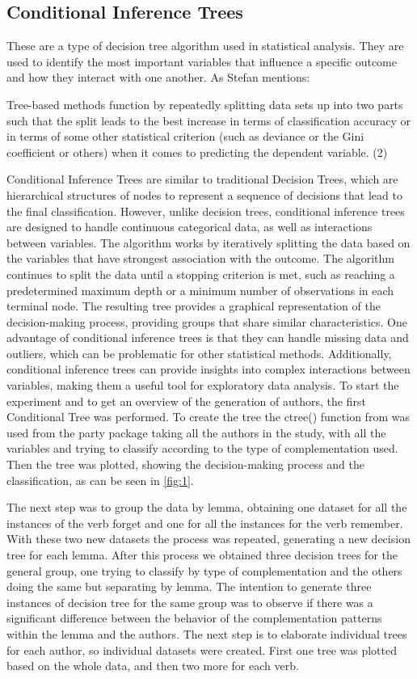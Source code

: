 \documentclass[final]{clv3} %
\begin{document}
\subsection{Conditional Inference Trees}
These are a type of decision tree algorithm used in statistical analysis. They are used to identify the most important variables that influence a specific outcome and how they interact with one another. As Stefan \citet{th2019classification} mentions:
\begin{extract}Tree-based methods function by repeatedly splitting data sets up into two parts such that the split leads to the best increase in terms of classification accuracy or in terms of some other statistical criterion (such as deviance or the Gini coefficient or others) when it comes to predicting the dependent variable. (2)
\end{extract}
Conditional Inference Trees are similar to traditional Decision Trees, which are hierarchical structures of nodes to represent a sequence of decisions that lead to the final classification. However, unlike decision trees, conditional inference trees are designed to handle continuous categorical data, as well as interactions between variables. The algorithm works by iteratively splitting the data based on the variables that have strongest association with the outcome. The algorithm continues to split the data until a stopping criterion is met, such as reaching a predetermined maximum depth or a minimum number of observations in each terminal node. The resulting tree provides a graphical representation of the decision-making process, providing groups that share similar characteristics. One advantage of conditional inference trees is that they can handle missing data and outliers, which can be problematic for other statistical methods. Additionally, conditional inference trees can provide insights into complex interactions between variables, making them a useful tool for exploratory data analysis. To start the experiment and to get an overview of the generation of authors, the first Conditional Tree was performed. To create the tree the ctree() function from was used from the party package \citep{PARTY} taking all the authors in the study, with all the variables and trying to classify according to the type of complementation used. Then the tree was plotted, showing the decision-making process and the classification, as can be seen in  \cref{fig:1}.

The next step was to group the data by lemma, obtaining one dataset for all the instances of the verb forget and one for all the instances for the verb remember. With these two new datasets the process was repeated, generating a new decision tree for each lemma. After this process we obtained three decision trees for the general group, one trying to classify by type of complementation and the others doing the same but separating by lemma. The intention to generate three instances of decision tree for the same group was to observe if there was a significant difference between the behavior of the complementation patterns within the lemma and the authors. The next step is to elaborate individual trees for each author, so individual datasets were created. First one tree was plotted based on the whole data, and then two more for each verb.
\end{document}
